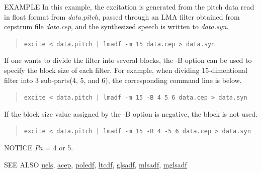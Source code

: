 \begin{qsection}{EXAMPLE}
In this example, the excitation is generated from
the pitch data read in float format from {\em data.pitch},
passed through an LMA filter obtained from cepstrum file
{\em data.cep}, and the synthesized speech is written to
{\em data.syn}.
\begin{quote}
 \verb!excite < data.pitch | lmadf -m 15 data.cep > data.syn!
\end{quote} 
If one wants to divide the filter into several blocks, the -B option
can be used to specify the block size of each filter.
For example, when dividing 15-dimentional filter into 3 sub-parts(4,
5, and 6), the corresponding command line is below.
\begin{quote}
 \verb!excite < data.pitch | lmadf -m 15 -B 4 5 6 data.cep > data.syn!
\end{quote}
If the block size value assigned by the -B option is negative, the
block is not used.
\begin{quote}
 \verb!excite < data.pitch | lmadf -m 15 -B 4 -5 6 data.cep > data.syn!
\end{quote}

\end{qsection}

\begin{qsection}{NOTICE}
$Pa$ = 4 or 5.\\
\end{qsection}

\begin{qsection}{SEE ALSO}
\hyperlink{uels}{uels},
\hyperlink{acep}{acep},
\hyperlink{poledf}{poledf},
\hyperlink{ltcdf}{ltcdf},
\hyperlink{glsadf}{glsadf},
\hyperlink{mlsadf}{mlsadf},
\hyperlink{mglsadf}{mglsadf}
\end{qsection}
